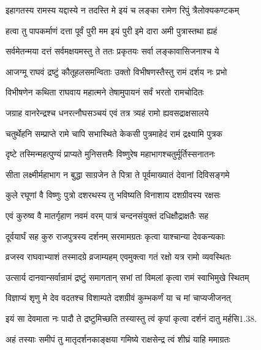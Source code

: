 \twolineshloka
{इहागतस्य रामस्य यद्दास्ये न तदस्ति मे}
{इयं च लङ्का रामेण रिपुं त्रैलोक्यकण्टकम्}%

\twolineshloka
{हत्वा तु पापकर्माणं दत्ता पूर्वं पुरी मम}
{इयं पुरी इमे दारा अमी पुत्रास्तथा ह्यहं}%

\twolineshloka
{सर्वमेतन्मया दत्तं सर्वमक्षयमस्तु ते}
{ततः प्रकृतयः सर्वा लङ्कावासिजनाश्च ये}%

\twolineshloka
{आजग्मू राघवं द्रष्टुं कौतूहलसमन्विताः}
{उक्तो विभीषणस्तैस्तु रामं दर्शय नः प्रभो}%

\twolineshloka
{विभीषणेन कथिता राघवाय महात्मने}
{तेषामुपायनं सर्वं भरतो रामचोदितः}%

\twolineshloka
{जग्राह वानरेन्द्रश्च धनरत्नौघसञ्चयं}
{एवं तत्र त्र्यहं रामो ह्यवसद्राक्षसालये}%

\twolineshloka
{चतुर्थेहनि सम्प्राप्ते रामे चापि सभास्थिते}
{केकसी पुत्रमाहेदं रामं द्रक्ष्यामि पुत्रक}%

\twolineshloka
{दृष्टे तस्मिन्महत्पुण्यं प्राप्यते मुनिसत्तमैः}
{विष्णुरेष महाभागश्चतुर्मूर्तिस्सनातनः}%

\twolineshloka
{सीता लक्ष्मीर्महाभाग न बुद्धा साग्रजेन ते}
{पित्रा ते पूर्वमाख्यातं देवानां दिविसङ्गमे}%

\twolineshloka
{कुले रघूणां वै विष्णुः पुत्रो दशरथस्य तु}
{भविष्यति विनाशाय दशग्रीवस्य रक्षसः}%


\twolineshloka
{एवं कुरुष्व वै मातर्गृहाण नवमं वरम्}
{पात्रं चन्दनसंयुक्तं दधिक्षौद्राक्षतैः सह}%

\twolineshloka
{दूर्वयार्घं सह कुरु राजपुत्रस्य दर्शनम्}
{सरमामग्रतः कृत्वा याश्चान्या देवकन्यकाः}%

\twolineshloka
{व्रजस्व राघवाभ्याशं तस्मादग्रे व्रजाम्यहम्}
{एवमुक्त्वा गतं रक्षो यत्र रामो व्यवस्थितः}%

\twolineshloka
{उत्सार्य दानवान्सर्वान्रामं द्रष्टुं समागतान्}
{सभां तां विमलां कृत्वा रामं स्वाभिमुखे स्थितम्}%


\twolineshloka
{विज्ञाप्यं शृणु मे देव वदतश्च विशाम्पते}
{दशग्रीवं कुम्भकर्णं या च मां चाप्यजीजनत्}%

\twolineshloka
{इयं सा देवमाता नः पादौ ते द्रष्टुमिच्छति}
{तस्यास्तु त्वं कृपां कृत्वा दर्शनं दातु मर्हसि1.38.}%


\twolineshloka
{अहं तस्याः समीपं तु मातृदर्शनकाङ्क्षया}
{गमिष्ये राक्षसेन्द्र त्वं शीघ्रं याहि ममाग्रतः}%

